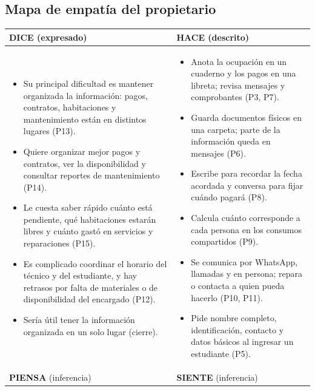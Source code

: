 \documentclass[12pt,a4paper]{article}
\renewcommand{\arraystretch}{1.12}
\begin{document}
\subsection{Mapa de empatía del propietario}
{\footnotesize
\renewcommand{\arraystretch}{1.1}
\begin{tabularx}{\linewidth}{|X|X|}
\hline
\rowcolor{fondo}\textbf{\color{azul}DICE} (expresado) & \textbf{\color{azul}HACE} (descrito) \\ \hline
\begin{itemize}[leftmargin=*,itemsep=1pt,topsep=2pt,label=--]
\item {Su principal dificultad es mantener organizada la información: pagos, contratos, habitaciones y mantenimiento están en distintos lugares (P13).}
\item {Quiere organizar mejor pagos y contratos, ver la disponibilidad y consultar reportes de mantenimiento (P14).}
\item {Le cuesta saber rápido cuánto está pendiente, qué habitaciones estarán libres y cuánto gastó en servicios y reparaciones (P15).}
\item {Es complicado coordinar el horario del técnico y del estudiante, y hay retrasos por falta de materiales o de disponibilidad del encargado (P12).}
\item {Sería útil tener la información organizada en un solo lugar (cierre).}
\end{itemize}
&
\begin{itemize}[leftmargin=*,itemsep=1pt,topsep=2pt,label=--]
\item {Anota la ocupación en un cuaderno y los pagos en una libreta; revisa mensajes y comprobantes (P3, P7).}
\item {Guarda documentos físicos en una carpeta; parte de la información queda en mensajes (P6).}
\item {Escribe para recordar la fecha acordada y conversa para fijar cuándo pagará (P8).}
\item {Calcula cuánto corresponde a cada persona en los consumos compartidos (P9).}
\item {Se comunica por WhatsApp, llamadas y en persona; repara o contacta a quien pueda hacerlo (P10, P11).}
\item {Pide nombre completo, identificación, contacto y datos básicos al ingresar un estudiante (P5).}
\end{itemize} \\ \hline
\rowcolor{fondo}\textbf{\color{azul}PIENSA} (inferencia) & \textbf{\color{azul}SIENTE} (inferencia) \\ \hline

\end{tabularx}}
\end{document}
